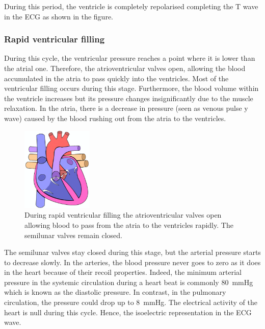 During this period, the ventricle is completely repolarised completing the T wave in the ECG as shown in the figure.

\subsubsection{Rapid ventricular filling}
During this cycle, the ventricular pressure reaches a point where it is lower than the atrial one. Therefore, the atrioventricular valves open, allowing the blood accumulated in the atria to pass quickly into the ventricles. Most of the ventricular filling occurs during this stage. Furthermore, the blood volume within the ventricle increases but its pressure changes insignificantly due to the muscle relaxation. In the atria, there is a decrease in pressure (seen as venous pulse y wave) caused by the blood rushing out from the atria to the ventricles. 

\begin{figure}[!htpb]
	\centering
	\includegraphics[height=4cm,keepaspectratio]{figure_12}
	\caption[Heart during rapid ventricular filling]{During rapid ventricular filling the atrioventricular valves open allowing blood to pass from the atria to the ventricles rapidly. The semilunar valves remain closed.}
	\label{fig:heart rapid ventricular filling}
\end{figure}

The semilunar valves stay closed during this stage, but the arterial pressure starts to decrease slowly. In the arteries, the blood pressure never goes to zero as it does in the heart because of their recoil properties. Indeed, the minimum arterial pressure in the systemic circulation during a heart beat is commonly \SI{80}{\mmHg} which is known as the diastolic pressure. In contrast, in the pulmonary circulation, the pressure could drop up to \SI{8}{\mmHg}. The electrical activity of the heart is null during this cycle. Hence, the isoelectric representation in the ECG wave.


